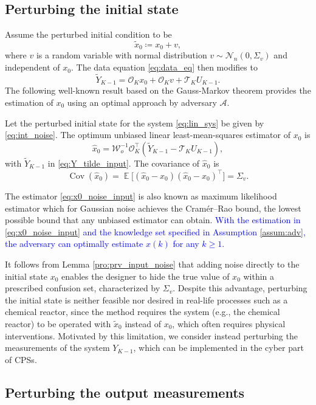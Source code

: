 \documentclass{ifacconf}
\DeclareMathOperator{\Cov}{Cov}
\newcommand{\calA}{\ensuremath{\mathcal{A}}}
\newcommand{\calN}{\ensuremath{\mathcal{N}}}
\newcommand{\calO}{\ensuremath{\mathcal{O}}}
\newcommand{\calT}{\ensuremath{\mathcal{T}}}
\newcommand{\calW}{\ensuremath{\mathcal{W}}}
\DeclareMathOperator{\E}{\mathbb{E}}
\def\be{\begin{equation}}
\def\ee{\end{equation}}
\newcommand{\+}{\mathsmaller{+}}
\newcommand{\blue}[1]{\textcolor{blue}{#1}}
\begin{document}
\subsection{Perturbing the initial state}
Assume the perturbed initial condition to be
\be\label{eq:int_noise}
\tilde{x}_0 \coloneqq x_0 + v,
 \ee
where $v$ is a random variable with normal distribution $v \sim \calN_n(0, \Sigma_v)$ and independent of $x_0$.
The data equation \eqref{eq:data_eq} then modifies to
\be\label{eq:Y_tilde_input}
\tilde{Y}_{K-1} = \calO_K x_0 + \calO_K v + \calT_{K}U_{K-1}.
\ee
The following well-known result based on the Gauss-Markov theorem \cite[p. 97]{kailath2000linear} provides the estimation of $x_0$ using an optimal approach by adversary $\calA$.
\begin{lem}\label{pro:prv_input_noise}
	Let the perturbed initial state for the system \eqref{eq:lin_sys} be given by \eqref{eq:int_noise}.	
	 The optimum unbiased linear least-mean-squares estimator of $x_0$ is
	\be\label{eq:x0_noise_input}
	\hat{x}_0 =
	\calW_o^{-1}\calO_K^\top(\tilde{Y}_{K-1} - \calT_{K}U_{K-1}), 
	\ee 
	with $\tilde{Y}_{K-1}$ in \eqref{eq:Y_tilde_input}. The covariance of $\hat{x}_0$ is
	\[
	\Cov(\hat{x}_0) = \E\big[(\hat{x}_0 -x_0)(\hat{x}_0 - x_0)^\top\big] = 
	\Sigma_v.
	\]
\end{lem}
The estimator \eqref{eq:x0_noise_input} is also known as maximum likelihood estimator which for Gaussian noise achieves the Cram\'er–Rao bound, the lowest possible bound that any unbiased estimator can obtain. \blue{With the estimation in \eqref{eq:x0_noise_input} and the knowledge set specified in Assumption \ref{assum:adv}, the adversary can optimally estimate $x(k)$ for any $k \geq 1$.}
\par It follows from Lemma \ref{pro:prv_input_noise} that adding noise directly to the initial state $x_0$ enables the designer to hide the true value of $x_0$ within a prescribed confusion set, characterized by $\Sigma_v$.
%
Despite this advantage, perturbing the initial state is neither feasible nor desired in real-life processes such as a chemical reactor,  since the method requires the system (e.g., the chemical reactor) to be operated with $\tilde{x}_0$ instead of $x_0$, which often requires physical interventions.  
Motivated by this limitation, we consider instead perturbing the measurements of the system $Y_{K-1}$, which can be implemented in the cyber part of CPSs.

\subsection{Perturbing the output measurements}
\end{document}

